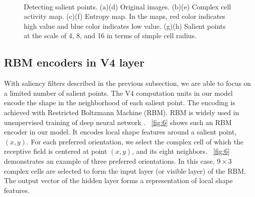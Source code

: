 \documentclass[twocolumn]{article}
\begin{document}
\begin{figure}[!t]
\\
\hfil
{}
\caption{Detecting salient points. (a)(d) Original images.
(b)(e) Complex cell activity map. 
(c)(f) Entropy map.
In the maps, red color indicates high value and blue color indicates low value.
(g)(h) Salient points at the scale of 4, 8, and 16 in terms of simple cell radius.}
\label{fig:5}
\end{figure}

\subsection{RBM encoders in V4 layer}

With saliency filters described in the previous subsection, we are able to focus on a limited number of salient points.
The V4 computation units in our model encode the shape in the neighborhood of each salient point.
The encoding is achieved with Restricted Boltzmann Machine (RBM).
RBM is widely used in unsupervised training of deep neural network \cite{bengio2009}.
\figurename~\ref{fig:6} shows such an RBM encoder in our model.
It encodes local shape features around a salient point, $(x,y)$.
For each preferred orientation, we select the complex cell of which the receptive field is centered at point $(x,y)$, and its eight neighbors.
\figurename~\ref{fig:6} demonstrates an example of three preferred orientations.
In this case, $9\times3$ complex cells are selected to form the input layer (or visible layer) of the RBM.
The output vector of the hidden layer forms a representation of local shape features.
\end{document}
